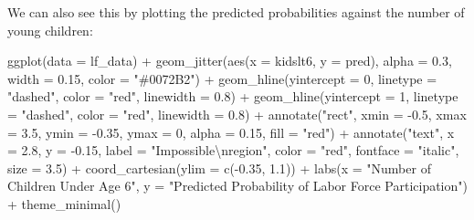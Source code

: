 \documentclass[
  letterpaper,
  DIV=11,
  numbers=noendperiod]{scrreprt}
\newenvironment{Shaded}{\begin{snugshade}}{\end{snugshade}}
\newcommand{\AttributeTok}[1]{\textcolor[rgb]{0.40,0.45,0.13}{#1}}
\newcommand{\DecValTok}[1]{\textcolor[rgb]{0.68,0.00,0.00}{#1}}
\newcommand{\FloatTok}[1]{\textcolor[rgb]{0.68,0.00,0.00}{#1}}
\newcommand{\FunctionTok}[1]{\textcolor[rgb]{0.28,0.35,0.67}{#1}}
\newcommand{\NormalTok}[1]{\textcolor[rgb]{0.00,0.23,0.31}{#1}}
\newcommand{\SpecialCharTok}[1]{\textcolor[rgb]{0.37,0.37,0.37}{#1}}
\newcommand{\StringTok}[1]{\textcolor[rgb]{0.13,0.47,0.30}{#1}}
\begin{document}
We can also see this by plotting the predicted probabilities against the
number of young children:

\begin{Shaded}
\begin{Highlighting}[]
\FunctionTok{ggplot}\NormalTok{(}\AttributeTok{data =}\NormalTok{ lf\_data) }\SpecialCharTok{+}
    \FunctionTok{geom\_jitter}\NormalTok{(}\FunctionTok{aes}\NormalTok{(}\AttributeTok{x =}\NormalTok{ kidslt6, }\AttributeTok{y =}\NormalTok{ pred), }\AttributeTok{alpha =} \FloatTok{0.3}\NormalTok{, }\AttributeTok{width =} \FloatTok{0.15}\NormalTok{, }\AttributeTok{color =} \StringTok{"\#0072B2"}\NormalTok{) }\SpecialCharTok{+}
    \FunctionTok{geom\_hline}\NormalTok{(}\AttributeTok{yintercept =} \DecValTok{0}\NormalTok{, }\AttributeTok{linetype =} \StringTok{"dashed"}\NormalTok{, }\AttributeTok{color =} \StringTok{"red"}\NormalTok{, }\AttributeTok{linewidth =} \FloatTok{0.8}\NormalTok{) }\SpecialCharTok{+}
    \FunctionTok{geom\_hline}\NormalTok{(}\AttributeTok{yintercept =} \DecValTok{1}\NormalTok{, }\AttributeTok{linetype =} \StringTok{"dashed"}\NormalTok{, }\AttributeTok{color =} \StringTok{"red"}\NormalTok{, }\AttributeTok{linewidth =} \FloatTok{0.8}\NormalTok{) }\SpecialCharTok{+}
    \FunctionTok{annotate}\NormalTok{(}\StringTok{"rect"}\NormalTok{, }\AttributeTok{xmin =} \SpecialCharTok{{-}}\FloatTok{0.5}\NormalTok{, }\AttributeTok{xmax =} \FloatTok{3.5}\NormalTok{, }\AttributeTok{ymin =} \SpecialCharTok{{-}}\FloatTok{0.35}\NormalTok{, }\AttributeTok{ymax =} \DecValTok{0}\NormalTok{,}
             \AttributeTok{alpha =} \FloatTok{0.15}\NormalTok{, }\AttributeTok{fill =} \StringTok{"red"}\NormalTok{) }\SpecialCharTok{+}
    \FunctionTok{annotate}\NormalTok{(}\StringTok{"text"}\NormalTok{, }\AttributeTok{x =} \FloatTok{2.8}\NormalTok{, }\AttributeTok{y =} \SpecialCharTok{{-}}\FloatTok{0.15}\NormalTok{, }\AttributeTok{label =} \StringTok{"Impossible}\SpecialCharTok{\textbackslash{}n}\StringTok{region"}\NormalTok{,}
             \AttributeTok{color =} \StringTok{"red"}\NormalTok{, }\AttributeTok{fontface =} \StringTok{"italic"}\NormalTok{, }\AttributeTok{size =} \FloatTok{3.5}\NormalTok{) }\SpecialCharTok{+}
    \FunctionTok{coord\_cartesian}\NormalTok{(}\AttributeTok{ylim =} \FunctionTok{c}\NormalTok{(}\SpecialCharTok{{-}}\FloatTok{0.35}\NormalTok{, }\FloatTok{1.1}\NormalTok{)) }\SpecialCharTok{+}
    \FunctionTok{labs}\NormalTok{(}\AttributeTok{x =} \StringTok{"Number of Children Under Age 6"}\NormalTok{,}
         \AttributeTok{y =} \StringTok{"Predicted Probability of Labor Force Participation"}\NormalTok{) }\SpecialCharTok{+}
    \FunctionTok{theme\_minimal}\NormalTok{()}
\end{Highlighting}
\end{Shaded}
\end{document}
